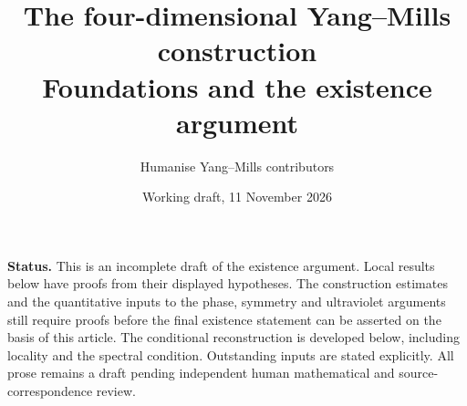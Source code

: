 \documentclass[11pt]{article}
\title{The four-dimensional Yang--Mills construction\\
\large Foundations and the existence argument}
\author{Humanise Yang--Mills contributors}
\date{Working draft, 11 November 2026}
\theoremstyle{remark}
\begin{document}
\maketitle
\noindent\textbf{Status.} This is an incomplete draft of the existence argument.
Local results below have proofs from their displayed hypotheses. The construction
estimates and the quantitative inputs to the phase, symmetry and ultraviolet
arguments still require proofs before the final existence statement can be
asserted on the basis of this article. The conditional reconstruction is
developed below, including locality and the spectral condition. Outstanding
inputs are stated explicitly. All prose remains a draft pending independent
human mathematical and source-correspondence review.
\tableofcontents



















































\end{document}
